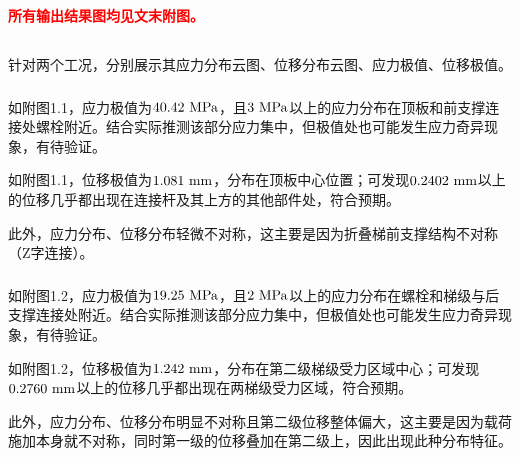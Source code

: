 \documentclass[12pt, oneside, a4paper]{ctexart}
\begin{document}
\section{}
\par{}
\textcolor{red}{\textbf{所有输出结果图均见文末附图。}}
\subsection{}
\par{}
针对两个工况，分别展示其应力分布云图、位移分布云图、应力极值、位移极值。
\subsubsection{}
\par{}
如附图1.1，应力极值为$\rm 40.42~MPa$，且$\rm 3~MPa$以上的应力分布在顶板和前支撑连接处螺栓附近。结合实际推测该部分应力集中，但极值处也可能发生应力奇异现象，有待验证。
\par{}
如附图1.1，位移极值为$\rm 1.081~mm$，分布在顶板中心位置；可发现$\rm 0.2402~mm$以上的位移几乎都出现在连接杆及其上方的其他部件处，符合预期。
\par{}
此外，应力分布、位移分布轻微不对称，这主要是因为折叠梯前支撑结构不对称（Z字连接）。
\subsubsection{}
\par{}
如附图1.2，应力极值为$\rm 19.25~MPa$，且$\rm 2~MPa$以上的应力分布在螺栓和梯级与后支撑连接处附近。结合实际推测该部分应力集中，但极值处也可能发生应力奇异现象，有待验证。
\par{}
如附图1.2，位移极值为$\rm 1.242~mm$，分布在第二级梯级受力区域中心；可发现$\rm 0.2760~mm$以上的位移几乎都出现在两梯级受力区域，符合预期。
\par{}
此外，应力分布、位移分布明显不对称且第二级位移整体偏大，这主要是因为载荷施加本身就不对称，同时第一级的位移叠加在第二级上，因此出现此种分布特征。
\subsection{}
\end{document}
